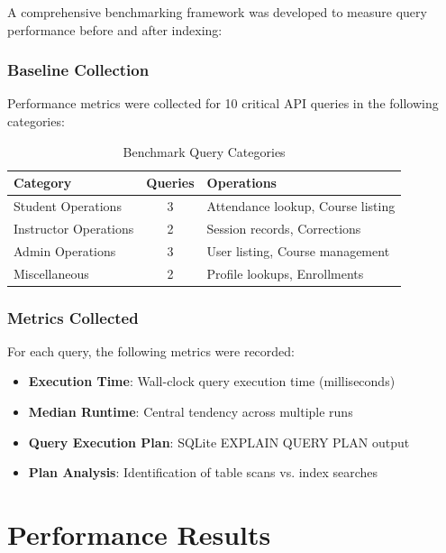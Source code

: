 \documentclass[conference]{IEEEtran}
\begin{document}
A comprehensive benchmarking framework was developed to measure query performance before and after indexing:

\subsubsection{Baseline Collection}

Performance metrics were collected for 10 critical API queries in the following categories:

\begin{table}[htbp]
\caption{Benchmark Query Categories}
\begin{center}
\begin{tabular}{|l|c|l|}
\hline
\textbf{Category} & \textbf{Queries} & \textbf{Operations} \\
\hline
Student Operations & 3 & Attendance lookup, Course listing \\
Instructor Operations & 2 & Session records, Corrections \\
Admin Operations & 3 & User listing, Course management \\
Miscellaneous & 2 & Profile lookups, Enrollments \\
\hline
\end{tabular}
\label{tab:query_categories}
\end{center}
\end{table}

\subsubsection{Metrics Collected}

For each query, the following metrics were recorded:

\begin{itemize}
    \item \textbf{Execution Time}: Wall-clock query execution time (milliseconds)
    \item \textbf{Median Runtime}: Central tendency across multiple runs
    \item \textbf{Query Execution Plan}: SQLite EXPLAIN QUERY PLAN output
    \item \textbf{Plan Analysis}: Identification of table scans vs. index searches
\end{itemize}

\section{Performance Results}
\end{document}
